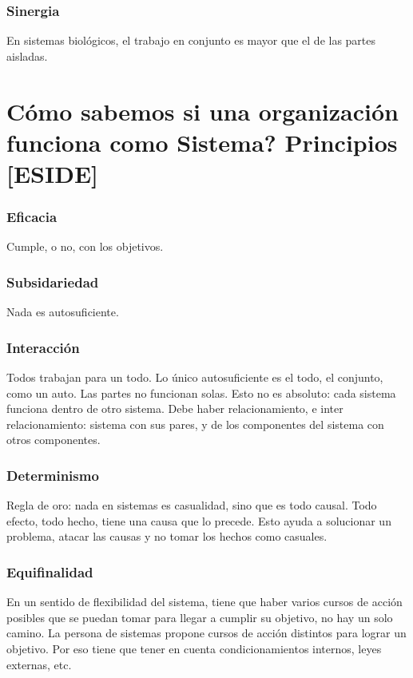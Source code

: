 \hypertarget{sinergia}{%
\subsubsection{Sinergia}\label{sinergia}}
En sistemas biológicos, el trabajo en conjunto es mayor que el de las partes aisladas.

\hypertarget{cuxf3mo-sabemos-si-una-organizaciuxf3n-funciona-como-sistema-principios-eside}{%
\section{Cómo sabemos si una organización funciona como Sistema?
Principios
{[}ESIDE{]}}\label{cuxf3mo-sabemos-si-una-organizaciuxf3n-funciona-como-sistema-principios-eside}}

\hypertarget{eficacia}{%
\subsubsection{Eficacia}\label{eficacia}}
Cumple, o no, con los objetivos.

\hypertarget{subsidariedad}{%
\subsubsection{Subsidariedad}\label{subsidariedad}}
Nada es autosuficiente.

\hypertarget{interaccion}{%
\subsubsection{Interacción}\label{interaccion}}
Todos trabajan para un todo. Lo único autosuficiente es el todo, el conjunto, como un auto. Las partes no funcionan solas. Esto no es absoluto: cada sistema funciona dentro de otro sistema. Debe haber relacionamiento, e inter relacionamiento: sistema con sus pares, y de los componentes del sistema con otros componentes.

\hypertarget{determinismo}{%
\subsubsection{Determinismo}\label{determinismo}}
Regla de oro: nada en sistemas es casualidad, sino que es todo causal. Todo efecto, todo hecho, tiene una causa que lo precede. Esto ayuda a solucionar un problema, atacar las causas y no tomar los hechos como casuales.

\hypertarget{equifinalidad}{%
\subsubsection{Equifinalidad}\label{equifinalidad}}
En un sentido de flexibilidad del sistema, tiene que haber varios cursos de acción posibles que se puedan tomar para llegar a cumplir su objetivo, no hay un solo camino. La persona de sistemas propone cursos de acción distintos para lograr un objetivo. Por eso tiene que tener en cuenta condicionamientos internos, leyes externas, etc.

